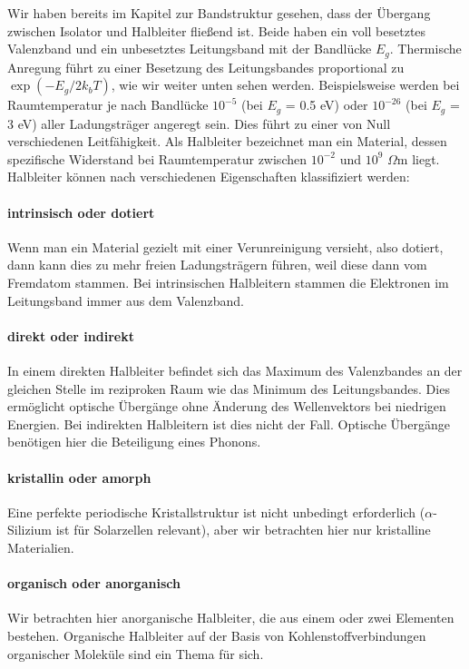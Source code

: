 Wir haben bereits im Kapitel zur Bandstruktur gesehen, dass der Übergang zwischen Isolator und Halbleiter fließend ist. Beide haben ein voll besetztes Valenzband und ein unbesetztes Leitungsband mit der Bandlücke $E_g$. Thermische Anregung führt zu einer Besetzung des Leitungsbandes proportional zu $\exp(- E_g / 2 k_b T)$, wie wir weiter unten sehen werden. Beispielsweise werden bei Raumtemperatur je nach Bandlücke $10^{-5}$ (bei $E_g$ = 0.5 eV) oder $10^{-26}$ (bei $E_g$ = 3 eV) aller Ladungsträger angeregt sein. Dies führt zu einer von Null verschiedenen Leitfähigkeit. Als Halbleiter bezeichnet man ein Material, dessen spezifische Widerstand bei Raumtemperatur zwischen $10^{-2}$ und $10^9$ $\Omega$m liegt. Halbleiter können  nach verschiedenen Eigenschaften klassifiziert werden:


\paragraph*{intrinsisch oder dotiert} Wenn man ein Material gezielt mit einer Verunreinigung versieht, also dotiert, dann kann dies zu mehr freien Ladungsträgern führen, weil diese dann vom Fremdatom stammen. Bei intrinsischen Halbleitern stammen die Elektronen im Leitungsband immer aus dem Valenzband.

\paragraph*{direkt oder indirekt} In einem direkten Halbleiter befindet sich das Maximum des Valenzbandes an der gleichen Stelle im reziproken Raum wie das Minimum des Leitungsbandes. Dies ermöglicht optische  Übergänge ohne Änderung des Wellenvektors bei niedrigen Energien. Bei indirekten Halbleitern ist dies nicht der Fall. Optische Übergänge benötigen hier die Beteiligung eines Phonons.

\paragraph*{kristallin oder amorph} Eine perfekte periodische Kristallstruktur ist nicht unbedingt erforderlich ($\alpha$-Silizium ist für Solarzellen relevant), aber wir betrachten hier nur kristalline Materialien.

\paragraph*{organisch oder anorganisch} Wir betrachten hier anorganische Halbleiter, die aus einem oder zwei Elementen bestehen. Organische Halbleiter auf der Basis von Kohlenstoffverbindungen organischer Moleküle sind ein Thema für sich.


